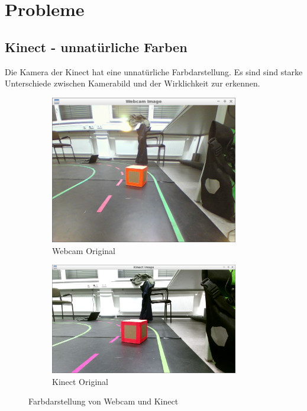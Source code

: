 \chapter{Probleme}
\label{cha:Probleme}

\section{Kinect - unnatürliche Farben}
\label{sec:farben}
Die Kamera der Kinect hat eine unnatürliche Farbdarstellung.
Es sind sind starke Unterschiede zwischen Kamerabild und der Wirklichkeit zur erkennen.

\begin{figure}[ht]
	\centering
	\begin{subfigure}{0.45\textwidth}
		\centering
		\includegraphics[width=0.9\textwidth]{images/Webcam_RAW.png}
		\caption{Webcam Original}
	\end{subfigure}
	\begin{subfigure}{0.45\textwidth}
		\centering
		\includegraphics[width=0.9\textwidth]{images/Kinect_qHD_RAW.png}
		\caption{Kinect Original}
	\end{subfigure}
	\caption{Farbdarstellung von Webcam und Kinect}
\end{figure}

